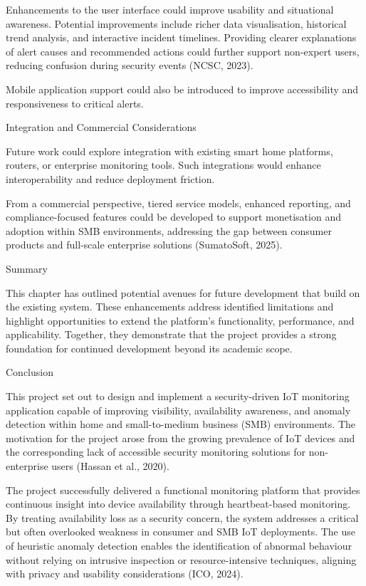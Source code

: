 Enhancements to the user interface could improve usability and situational awareness. Potential improvements include richer data visualisation, historical trend analysis, and interactive incident timelines. Providing clearer explanations of alert causes and recommended actions could further support non-expert users, reducing confusion during security events (NCSC, 2023).

Mobile application support could also be introduced to improve accessibility and responsiveness to critical alerts.

Integration and Commercial Considerations

Future work could explore integration with existing smart home platforms, routers, or enterprise monitoring tools. Such integrations would enhance interoperability and reduce deployment friction.

From a commercial perspective, tiered service models, enhanced reporting, and compliance-focused features could be developed to support monetisation and adoption within SMB environments, addressing the gap between consumer products and full-scale enterprise solutions (SumatoSoft, 2025).

Summary

This chapter has outlined potential avenues for future development that build on the existing system. These enhancements address identified limitations and highlight opportunities to extend the platform's functionality, performance, and applicability. Together, they demonstrate that the project provides a strong foundation for continued development beyond its academic scope.

Conclusion

This project set out to design and implement a security-driven IoT monitoring application capable of improving visibility, availability awareness, and anomaly detection within home and small-to-medium business (SMB) environments. The motivation for the project arose from the growing prevalence of IoT devices and the corresponding lack of accessible security monitoring solutions for non-enterprise users (Hassan et al., 2020).

The project successfully delivered a functional monitoring platform that provides continuous insight into device availability through heartbeat-based monitoring. By treating availability loss as a security concern, the system addresses a critical but often overlooked weakness in consumer and SMB IoT deployments. The use of heuristic anomaly detection enables the identification of abnormal behaviour without relying on intrusive inspection or resource-intensive techniques, aligning with privacy and usability considerations (ICO, 2024).

